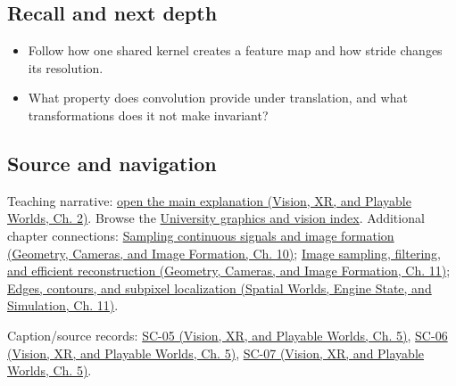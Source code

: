 \subsection{Recall and next depth}\label{appendix-47c51ea026fb-recall-and-next-depth}

\begin{itemize}
\tightlist
\item
  Follow how one shared kernel creates a feature map and how stride changes its resolution.
\item
  What property does convolution provide under translation, and what transformations does it not make invariant?
\end{itemize}

\subsection{Source and navigation}\label{appendix-47c51ea026fb-source-and-navigation}

Teaching narrative: \href{../07-Vision-XR-and-Playable-Worlds/main.pdf\#nameddest=04-visual-computing-ii-ch031-convolutional-models-preserve-image-neighborhoods}{open the main explanation (Vision, XR, and Playable Worlds, Ch. 2)}. Browse the \hyperref[appendix-a6d556a4ef50-university-graphics-vision-and-photography---independent-series]{University graphics and vision index}. Additional chapter connections: \href{../03-Geometry-Cameras-and-Image-Formation/main.pdf\#nameddest=03-visual-computing-i-ch003-sampling-continuous-signals-and-image-formation}{Sampling continuous signals and image formation (Geometry, Cameras, and Image Formation, Ch. 10)}; \href{../03-Geometry-Cameras-and-Image-Formation/main.pdf\#nameddest=03-visual-computing-i-ch004-image-sampling-filtering-and-efficient-reconstruction}{Image sampling, filtering, and efficient reconstruction (Geometry, Cameras, and Image Formation, Ch. 11)}; \href{../05-Spatial-Worlds-Engine-State-and-Simulation/main.pdf\#nameddest=04-visual-computing-ii-ch030-edges-contours-and-subpixel-localization}{Edges, contours, and subpixel localization (Spatial Worlds, Engine State, and Simulation, Ch. 11)}.

Caption/source records: \href{../07-Vision-XR-and-Playable-Worlds/main.pdf\#nameddest=04-visual-computing-ii-ch036-sc-05---stanford-cs231n-spring-2025-lecture-5-image-classification-with-cnns}{SC-05 (Vision, XR, and Playable Worlds, Ch. 5)}, \href{../07-Vision-XR-and-Playable-Worlds/main.pdf\#nameddest=04-visual-computing-ii-ch036-sc-06---stanford-cs231n-deep-learning-for-computer-vision-spring-2025-lecture-6-cnn-architectures}{SC-06 (Vision, XR, and Playable Worlds, Ch. 5)}, \href{../07-Vision-XR-and-Playable-Worlds/main.pdf\#nameddest=04-visual-computing-ii-ch036-sc-07---stanford-cs231n-spring-2025-lecture-7-recurrent-neural-networks}{SC-07 (Vision, XR, and Playable Worlds, Ch. 5)}.
